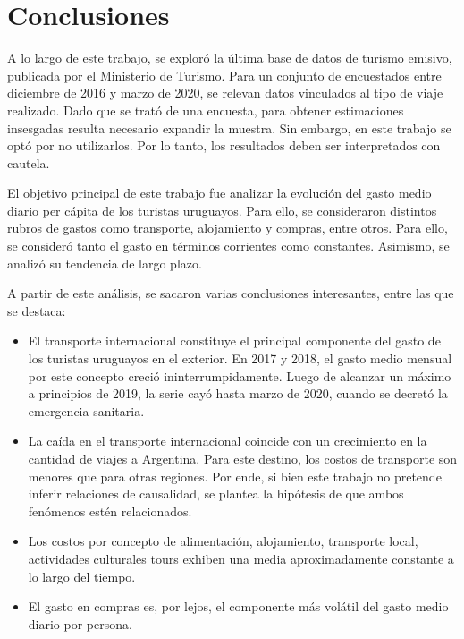 \documentclass[
]{article}
\providecommand{\tightlist}{%
  \setlength{\itemsep}{0pt}\setlength{\parskip}{0pt}}
\begin{document}
\hypertarget{conclusiones}{%
\section{\texorpdfstring{Conclusiones
\label{conclusiones}}{Conclusiones }}\label{conclusiones}}

A lo largo de este trabajo, se exploró la última base de datos de
turismo emisivo, publicada por el Ministerio de Turismo. Para un
conjunto de encuestados entre diciembre de 2016 y marzo de 2020, se
relevan datos vinculados al tipo de viaje realizado. Dado que se trató
de una encuesta, para obtener estimaciones insesgadas resulta necesario
expandir la muestra. Sin embargo, en este trabajo se optó por no
utilizarlos. Por lo tanto, los resultados deben ser interpretados con
cautela.

El objetivo principal de este trabajo fue analizar la evolución del
gasto medio diario per cápita de los turistas uruguayos. Para ello, se
consideraron distintos rubros de gastos como transporte, alojamiento y
compras, entre otros. Para ello, se consideró tanto el gasto en términos
corrientes como constantes. Asimismo, se analizó su tendencia de largo
plazo.

A partir de este análisis, se sacaron varias conclusiones interesantes,
entre las que se destaca:

\begin{itemize}
\tightlist
\item
  El transporte internacional constituye el principal componente del
  gasto de los turistas uruguayos en el exterior. En 2017 y 2018, el
  gasto medio mensual por este concepto creció ininterrumpidamente.
  Luego de alcanzar un máximo a principios de 2019, la serie cayó hasta
  marzo de 2020, cuando se decretó la emergencia sanitaria.
\item
  La caída en el transporte internacional coincide con un crecimiento en
  la cantidad de viajes a Argentina. Para este destino, los costos de
  transporte son menores que para otras regiones. Por ende, si bien este
  trabajo no pretende inferir relaciones de causalidad, se plantea la
  hipótesis de que ambos fenómenos estén relacionados.
\item
  Los costos por concepto de alimentación, alojamiento, transporte
  local, actividades culturales tours exhiben una media aproximadamente
  constante a lo largo del tiempo.
\item
  El gasto en compras es, por lejos, el componente más volátil del gasto
  medio diario por persona.
\end{itemize}
\end{document}
